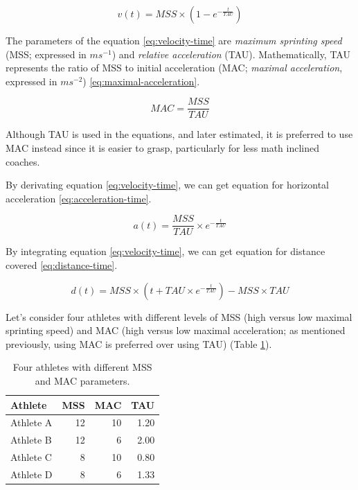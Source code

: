 \documentclass[
]{jss}
\begin{document}
\begin{equation}
  v(t) = MSS \times (1 - e^{-\frac{t}{TAU}}) \label{eq:velocity-time}
\end{equation}

The parameters of the equation \eqref{eq:velocity-time} are \textit{maximum sprinting speed} (MSS; expressed in \(ms^{-1}\)) and \textit{relative acceleration} (TAU). Mathematically, TAU represents the ratio of MSS to initial acceleration (MAC; \textit{maximal acceleration}, expressed in \(ms^{-2}\)) \eqref{eq:maximal-acceleration}.

\begin{equation}
  MAC = \frac{MSS}{TAU}\label{eq:maximal-acceleration}
\end{equation}

Although TAU is used in the equations, and later estimated, it is preferred to use MAC instead since it is easier to grasp, particularly for less math inclined coaches.

By derivating equation \eqref{eq:velocity-time}, we can get equation for horizontal acceleration \eqref{eq:acceleration-time}.

\begin{equation}
  a(t) = \frac{MSS}{TAU} \times e^{-\frac{t}{TAU}}  \label{eq:acceleration-time}
\end{equation}

By integrating equation \eqref{eq:velocity-time}, we can get equation for distance covered \eqref{eq:distance-time}.

\begin{equation}
  d(t) = MSS \times (t + TAU \times e^{-\frac{t}{TAU}}) - MSS \times TAU  \label{eq:distance-time}
\end{equation}

Let's consider four athletes with different levels of MSS (high versus low maximal sprinting speed) and MAC (high versus low maximal acceleration; as mentioned previously, using MAC is preferred over using TAU) (Table \ref{tab:four-athletes-table}).

\begin{CodeChunk}
\begin{table}

\caption{\label{tab:four-athletes-table}Four athletes with different MSS and MAC parameters.}
\centering
\begin{tabular}[t]{l|r|r|r}
\hline
Athlete & MSS & MAC & TAU\\
\hline
Athlete A & 12 & 10 & 1.20\\
\hline
Athlete B & 12 & 6 & 2.00\\
\hline
Athlete C & 8 & 10 & 0.80\\
\hline
Athlete D & 8 & 6 & 1.33\\
\hline
\end{tabular}
\end{table}

\end{CodeChunk}
\end{document}
